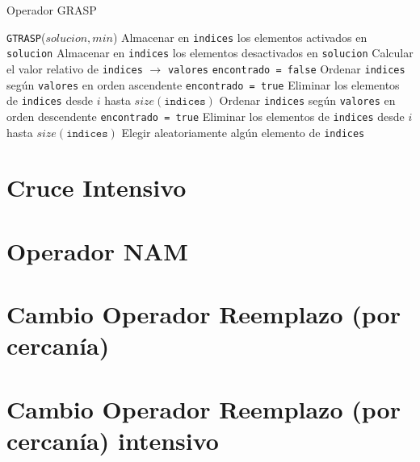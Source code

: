 \begin{algorithm}
\caption{Operador GRASP}\label{alg:GRASP}
\begin{algorithmic}[1]
\Procedure \texttt{GTRASP}($solucion, min$)
	\State Almacenar en \texttt{indices} los elementos activados en \texttt{solucion}
\Else
	\State Almacenar en \texttt{indices} los elementos desactivados en \texttt{solucion}
\EndIf
\State Calcular el valor relativo de \texttt{indices} $\xrightarrow{}{}$ \texttt{valores}
\State \texttt{encontrado = false}
	\State Ordenar \texttt{indices} según \texttt{valores} en orden ascendente
			\State \texttt{encontrado = true}
			\State Eliminar los elementos de \texttt{indices} desde $i$ hasta $size(\texttt{indices})$
		\EndIf
	\EndFor
\Else
	\State Ordenar \texttt{indices} según \texttt{valores} en orden descendente
			\State \texttt{encontrado = true}
			\State Eliminar los elementos de \texttt{indices} desde $i$ hasta $size(\texttt{indices})$
		\EndIf
	\EndFor
\EndIf
\State Elegir aleatoriamente algún elemento de \texttt{indices}
\EndProcedure
\end{algorithmic}
\end{algorithm}

\section{Cruce Intensivo}



\section{Operador NAM}

\section{Cambio Operador Reemplazo (por cercanía)}

\section{Cambio Operador Reemplazo (por cercanía) intensivo}